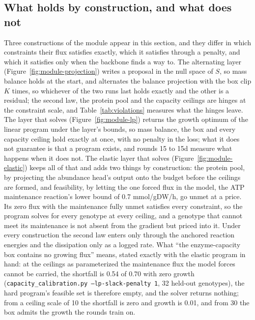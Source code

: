 \subsection{What holds by construction, and what does not}
\label{sec:by-construction}

Three constructions of the module appear in this section, and they differ in which
constraints their flux satisfies exactly, which it satisfies through a penalty, and
which it satisfies only when the backbone finds a way to. The alternating layer
(Figure~\ref{fig:module-projection}) writes a proposal in the null space of $S$, so mass
balance holds at the start, and alternates the balance projection with the box clip
$K$ times, so whichever of the two runs last holds exactly and the other is a residual;
the second law, the protein pool and the capacity ceilings are hinges at the constraint
scale, and Table~\ref{tab:violations} measures what the hinges leave. The layer that
solves (Figure~\ref{fig:module-lp}) returns the growth optimum of the linear program
under the layer's bounds, so mass balance, the box and every capacity ceiling hold
exactly at once, with no penalty in the loss; what it does not guarantee is that a
program exists, and rounds 15 to 15d measure what happens when it does not. The elastic
layer that solves (Figure~\ref{fig:module-elastic}) keeps all of that and adds two
things by construction: the protein pool, by projecting the abundance head's output onto
the budget before the ceilings are formed, and feasibility, by letting the one forced
flux in the model, the ATP maintenance reaction's lower bound of 0.7 mmol/gDW/h, go
unmet at a price. Its zero flux with the maintenance fully unmet satisfies every
constraint, so the program solves for every genotype at every ceiling, and a genotype
that cannot meet its maintenance is not absent from the gradient but priced into it.
Under every construction the second law enters only through the anchored reaction
energies and the dissipation only as a logged rate. What ``the enzyme-capacity box
contains no growing flux'' means, stated exactly with the elastic program in hand: at
the ceilings as parameterized the maintenance flux the model forces cannot be carried,
the shortfall is 0.54 of 0.70 with zero growth (\texttt{capacity\_calibration.py
--lp-slack-penalty 1}, 32 held-out genotypes), the hard program's feasible set is
therefore empty, and the solver returns nothing; from a ceiling scale of 10 the
shortfall is zero and growth is 0.01, and from 30 the box admits the growth the rounds
train on.

